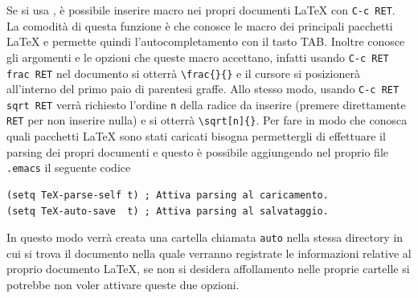\documentclass[11pt,a4paper]{article}
\begin{document}
Se si usa \auctex{}, è possibile inserire macro nei propri documenti \LaTeX{}
con \verb!C-c RET!.  La comodità di questa funzione è che \auctex{} conosce le
macro dei principali pacchetti \LaTeX{} e permette quindi l'autocompletamento
con il tasto TAB.  Inoltre conosce gli argomenti e le opzioni che queste macro
accettano, infatti usando \verb!C-c RET frac RET! nel documento si otterrà
\verb!\frac{}{}!  e il cursore si posizionerà all'interno del primo paio di
parentesi graffe.  Allo stesso modo, usando \verb!C-c RET sqrt RET! verrà
richiesto l'ordine \verb!n! della radice da inserire (premere direttamente
\verb!RET! per non inserire nulla) e si otterrà \verb!\sqrt[n]{}!.  Per fare in
modo che \auctex{} conosca quali pacchetti \LaTeX{} sono stati caricati bisogna
permettergli di effettuare il parsing dei propri documenti e questo è possibile
aggiungendo nel proprio file \verb!.emacs! il seguente codice
\begin{Verbatim}
(setq TeX-parse-self t) ; Attiva parsing al caricamento.
(setq TeX-auto-save  t) ; Attiva parsing al salvataggio.
\end{Verbatim}
In questo modo verrà creata una cartella chiamata \verb!auto! nella stessa
directory in cui si trova il documento nella quale verranno registrate le
informazioni relative al proprio documento \LaTeX{}, se non si desidera
affollamento nelle proprie cartelle si potrebbe non voler attivare queste due
opzioni.
\end{document}
